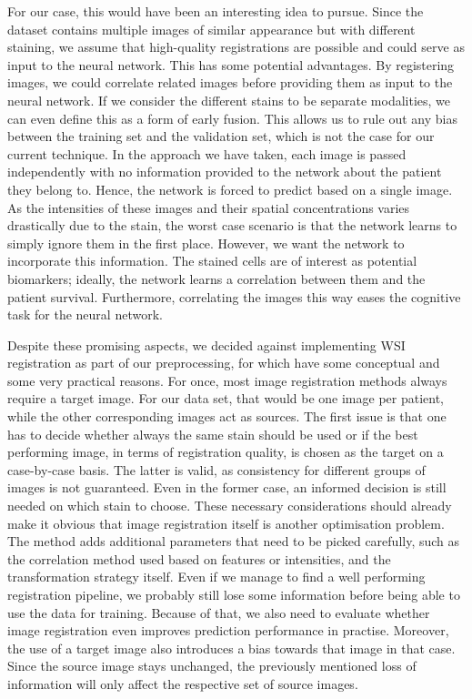 For our case, this would have been an interesting idea to pursue. Since the dataset contains multiple images of similar appearance but with different staining, we assume that high-quality registrations are possible and could serve as input to the neural network. This has some potential advantages. By registering images, we could correlate related images before providing them as input to the neural network. If we consider the different stains to be separate modalities, we can even define this as a form of early fusion. This allows us to rule out any bias between the training set and the validation set, which is not the case for our current technique. In the approach we have taken, each image is passed independently with no information provided to the network about the patient they belong to. Hence, the network is forced to predict based on a single image. As the intensities of these images and their spatial concentrations varies drastically due to the stain, the worst case scenario is that the network learns to simply ignore them in the first place. However, we want the network to incorporate this information. The stained cells are of interest as potential biomarkers; ideally, the network learns a correlation between them and the patient survival. Furthermore, correlating the images this way eases the cognitive task for the neural network.

Despite these promising aspects, we decided against implementing WSI registration as part of our preprocessing, for which have some conceptual and some very practical reasons. 
For once, most image registration methods always require a target image. For our data set, that would be one image per patient, while the other corresponding images act as sources. The first issue is that one has to decide whether always the same stain should be used or if the best performing image, in terms of registration quality, is chosen as the target on a case-by-case basis. The latter is valid, as consistency for different groups of images is not guaranteed. Even in the former case, an informed decision is still needed on which stain to choose. These necessary considerations should already make it obvious that image registration itself is another optimisation problem. The method adds additional parameters that need to be picked carefully, such as the correlation method used based on features or intensities, and the transformation strategy itself. 
Even if we manage to find a well performing registration pipeline, we probably still lose some information before being able to use the data for training. Because of that, we also need to evaluate whether image registration even improves prediction performance in practise. Moreover, the use of a target image also introduces a bias towards that image in that case. Since the source image stays unchanged, the previously mentioned loss of information will only affect the respective set of source images. 

